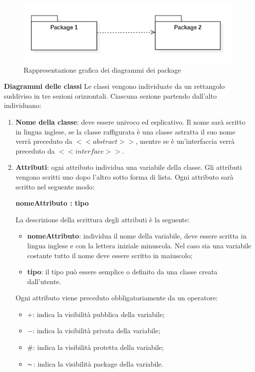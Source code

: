 \begin{figure}
		\centering\includegraphics{../immagini/normeUML/pk_uml.png}
		\caption{Rappresentazione grafica dei diagrammi dei package}
\end{figure}
\quad\large\textbf{Diagrammi delle classi}
Le classi vengono individuate da un rettangolo suddiviso in tre sezioni orizzontali. Ciascuna sezione partendo dall'alto individuano:
\begin{enumerate}
	\item \textbf{Nome della classe}: deve essere univoco ed esplicativo. Il nome sarà scritto in lingua inglese, se la classe raffigurata è una classe astratta il suo nome verrà preceduto da $<<abstract>>$, mentre se è un'interfaccia verrà preceduto da $<<interface>>$.
	\item \textbf{Attributi}: ogni attributo individua una variabile della classe. Gli attributi vengono scritti uno dopo l'altro sotto forma di lista. Ogni attributo sarà scritto nel seguente modo:
	\begin{center}
		\textbf{nomeAttributo : tipo}
	\end{center}
	La descrizione della scrittura degli attributi è la seguente:
	\begin{itemize}
		\item \textbf{nomeAttributo}: individua il nome della variabile, deve essere scritta in lingua inglese e con la lettera iniziale minuscola. Nel caso sia una variabile costante tutto il nome deve essere scritto in maiuscolo;
		\item \textbf{tipo}: il tipo può essere semplice o definito da una classe creata dall'utente.
	\end{itemize}
	Ogni attributo viene preceduto obbligatoriamente da un operatore:
	\begin{itemize}
		\item \textbf{$+$}: indica la visibilità pubblica della variabile;
		\item \textbf{$-$}: indica la visibilità privata della variabile;
		\item \textbf{$\#$}: indica la visibilità protetta della variabile;
		\item \textbf{$\thicksim$}: indica la visibilità package della variabile.

\end{itemize}
\end{enumerate}
